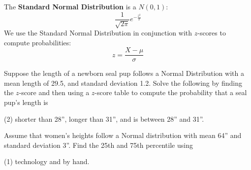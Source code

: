 \documentclass[../mathNotesPreamble]{subfiles}
\begin{document}
  \begin{defn*}
    The \textbf{Standard Normal Distribution} is a $N(0,1)$:
      \[\frac{1}{\sqrt{2\pi}} e^{-\frac{z^2}{2}}\]
    We use the Standard Normal Distribution in conjunction with $z$-scores to compute probabilities:
      \[z=\frac{X-\mu}{\sigma}\]
  \end{defn*}
  \begin{ex*}
    Suppose the length of a newborn seal pup follows a Normal Distribution with a mean length of 29.5, and standard deviation 1.2. Solve the following by finding the $z$-score and then using a $z$-score table to compute the probability that a seal pup's length is
  \end{ex*}
  \begin{extasks}[after-item-skip=\stretch{1}](2)
    \task shorter than 28'',
    \task longer than 31'', and
    \task is between 28'' and 31''.
  \end{extasks}
  \pagebreak

  \begin{ex*}
    Assume that women's heights follow a Normal distribution with mean 64'' and standard deviation 3''. Find the 25th and 75th percentile using
  \end{ex*}
  \begin{extasks}[after-item-skip=\stretch{1}](1)
    \task technology and
    \task by hand.
  \end{extasks}

  \pagebreak
\end{document}
